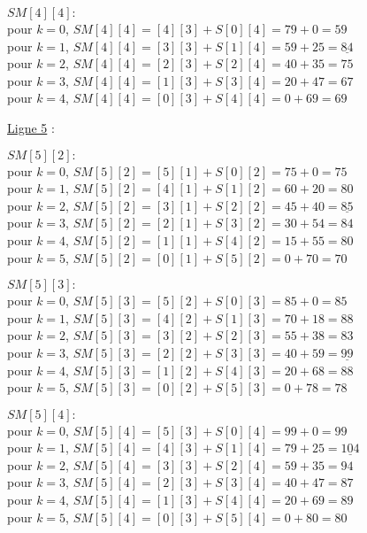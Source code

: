\documentclass[11pt]{article}
\begin{document}
\begin{enumerate}[label=\Roman*.]
$SM[4][4]:$\\
pour $k=0$, $SM[4][4]= [4][3] + S[0][4] = 79+0 = 59$ \\
pour $k=1$, $SM[4][4]= [3][3] + S[1][4] = 59+ 25 = \underline{84}$ \\
pour $k=2$, $SM[4][4]= [2][3] + S[2][4] = 40+ 35 = 75$ \\
pour $k=3$, $SM[4][4]= [1][3] + S[3][4] = 20+ 47 = 67$ \\
pour $k=4$, $SM[4][4]= [0][3] + S[4][4] = 0+ 69 = 69$ \\
\smallskip

 \underline{Ligne 5} : 
 
 \smallskip

 $SM[5][2]:$\\
pour $k=0$, $SM[5][2]= [5][1] + S[0][2] = 75+0 = 75$ \\
pour $k=1$, $SM[5][2]= [4][1] + S[1][2] = 60+ 20 = 80$ \\
pour $k=2$, $SM[5][2]= [3][1] + S[2][2] = 45+ 40 = \underline{85}$ \\
pour $k=3$, $SM[5][2]= [2][1] + S[3][2] = 30+ 54 = 84$ \\
pour $k=4$, $SM[5][2]= [1][1] + S[4][2] = 15+ 55 = 80$ \\
pour $k=5$, $SM[5][2]= [0][1] + S[5][2] = 0+ 70 = 70$ \\
\smallskip

$SM[5][3]:$\\
pour $k=0$, $SM[5][3]= [5][2] + S[0][3] = 85 +0 = 85$ \\
pour $k=1$, $SM[5][3]= [4][2] + S[1][3] = 70+ 18 = 88$ \\
pour $k=2$, $SM[5][3]= [3][2] + S[2][3] = 55+ 38 = 83$ \\
pour $k=3$, $SM[5][3]= [2][2] + S[3][3] = 40+ 59 = \underline{99}$ \\
pour $k=4$, $SM[5][3]= [1][2] + S[4][3] = 20+ 68 = 88$ \\
pour $k=5$, $SM[5][3]= [0][2] + S[5][3] = 0+ 78 = 78$ \\
\smallskip

$SM[5][4]:$\\
pour $k=0$, $SM[5][4]= [5][3] + S[0][4] = 99+0 = 99$ \\
pour $k=1$, $SM[5][4]= [4][3] + S[1][4] = 79+ 25 = \underline{104}$ \\
pour $k=2$, $SM[5][4]= [3][3] + S[2][4] = 59+ 35 = 94$ \\
pour $k=3$, $SM[5][4]= [2][3] + S[3][4] = 40+ 47 = 87$ \\
pour $k=4$, $SM[5][4]= [1][3] + S[4][4] = 20+ 69 = 89$ \\
pour $k=5$, $SM[5][4]= [0][3] + S[5][4] = 0+ 80 = 80$ \\
\smallskip


\end{enumerate}
\end{document}
